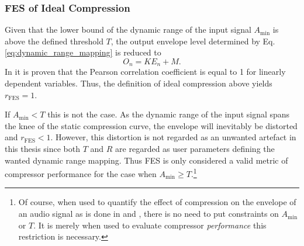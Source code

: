 \documentclass[../main2.tex]{subfiles}
\begin{document}
\subsubsection{FES of Ideal Compression}
Given that the lower bound of the dynamic range of the input signal $A_\text{min}$ is above the defined threshold $T$, the output envelope level determined by Eq.\eqref{eq:dynamic_range_mapping} is reduced to
\begin{equation}
O_n = K E_n + M.
\end{equation}
In \cite{XXXX} it is proven that the Pearson correlation coefficient is equal to 1 for linearly dependent variables. Thus, the definition of ideal compression above yields $r_\text{FES} = 1$.

If $A_\text{min} < T$ this is not the case. As the dynamic range of the input signal spans the knee of the static compression curve, the envelope will inevitably be distorted and $r_\text{FES} < 1$. However, this distortion is not regarded as an unwanted artefact in this thesis since both $T$ and $R$ are regarded as user parameters defining the wanted dynamic range mapping. Thus FES is only considered a valid metric of compressor performance for the case when $A_\text{min} \geq T$.\footnote{Of course, when used to quantify the effect of compression on the envelope of an audio signal as is done in \cite{XXXX} and \cite{XXXX}, there is no need to put constraints on $A_\text{min}$ or $T$. It is merely when used to evaluate compressor \emph{performance} this restriction is necessary.}

\end{document}
